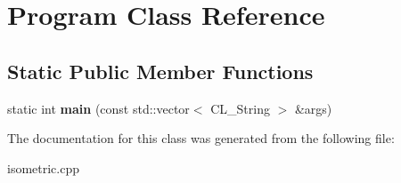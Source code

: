 \hypertarget{classProgram}{
\section{Program Class Reference}
\label{classProgram}
}
\subsection*{Static Public Member Functions}
\begin{DoxyCompactItemize}
\item 
\hypertarget{classProgram_a97eed8197e64916a57f1d89477932d7a}{
static int {\bfseries main} (const std::vector$<$ CL\_\-String $>$ \&args)}
\label{classProgram_a97eed8197e64916a57f1d89477932d7a}

\end{DoxyCompactItemize}


The documentation for this class was generated from the following file:\begin{DoxyCompactItemize}
\item 
isometric.cpp\end{DoxyCompactItemize}
